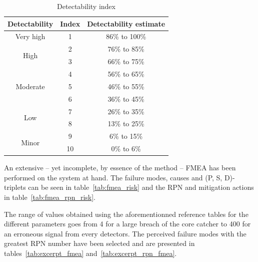 \begin{table}[!htb]
    \centering
        \begin{tabular}{ ccc }
        \hline
        Detectability & Index & Detectability estimate \\ \hline\hline
        Very high                   & 1  & 86\% to 100\% \\
        \multirow{2}{*}{High}       & 2  & 76\% to 85\% \\
                                    & 3  & 66\% to 75\% \\
        \multirow{3}{*}{Moderate}   & 4  & 56\% to 65\% \\
                                    & 5  & 46\% to 55\%\\
                                    & 6  & 36\% to 45\% \\
        \multirow{2}{*}{Low}        & 7  & 26\% to 35\% \\
                                    & 8  & 13\% to 25\%\\
        \multirow{2}{*}{Minor}      & 9  & 6\% to 15\% \\
                                    & 10 & 0\% to 6\% \\
                                     
        \end{tabular}
        \caption{Detectability index}\label{tab:detectability}
\end{table}

An extensive -- yet incomplete, by essence of the method -- FMEA has been performed on the system at hand. The failure modes, causes and (P, S, D)-triplets can be seen in table~\ref{tab:fmea_risk} and the RPN and mitigation actions in table~\ref{tab:fmea_rpn_risk}.

The range of values obtained using the aforementionned reference tables for the different parameters goes from 4 for a large breach of the core catcher to 400 for an erroneous signal from every detectors. The perceived failure modes with the greatest RPN number have been selected and are presented in tables~\ref{tab:excerpt_fmea} and~\ref{tab:excerpt_rpn_fmea}.

